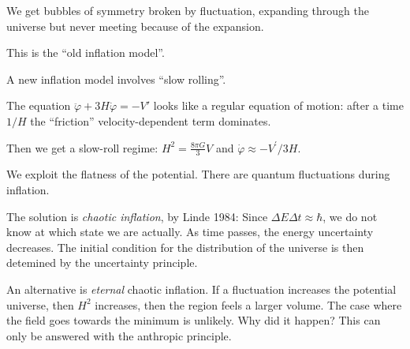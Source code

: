 \documentclass[main.tex]{subfiles}
\begin{document}
We get bubbles of symmetry broken by fluctuation, expanding through the universe but never meeting because of the expansion.

This is the ``old inflation model''.

A new inflation model involves ``slow rolling''.

The equation \(\ddot{\varphi } + 3 H \dot{\varphi } = - V'\) looks like a regular equation of motion: after a time \(1/H\) the ``friction'' velocity-dependent term dominates.

Then we get a slow-roll regime: \(H^2  = \frac{8 \pi G}{3} V \) and \(\dot{\varphi} \approx - V^{\prime }/3H\).

We exploit the flatness of the potential.
There are quantum fluctuations during inflation.

The solution is \emph{chaotic inflation}, by Linde 1984:
Since \(\Delta E \Delta t \approx \hbar\), we do not know at which state we are actually. 
As time passes, the energy uncertainty decreases.
The initial condition for the distribution of the universe is then detemined by the uncertainty principle.

An alternative is \emph{eternal} chaotic inflation.
If a fluctuation increases the potential universe, then \(H^2\) increases, then the region feels a larger volume. The case where the field goes towards the minimum is unlikely.
Why did it happen? This can only be answered with the anthropic principle.
\end{document}

